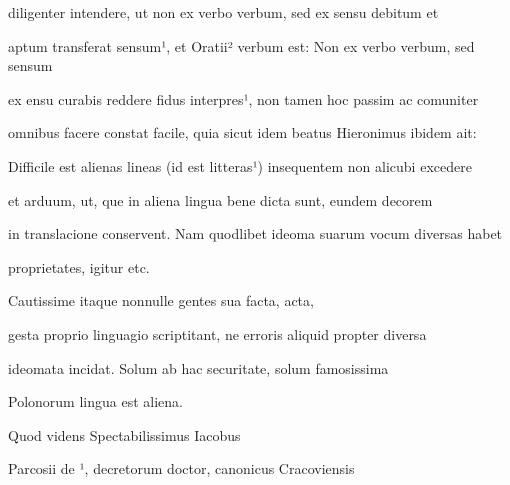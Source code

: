 \fulllines{}

diligenter intendere, ut non ex verbo verbum, sed ex sensu debitum et



aptum transferat sensum¹, et Oratii² verbum est: Non ex verbo verbum, sed sensum
%

ex ensu curabis reddere fidus interpres¹, non tamen hoc passim ac comuniter

omnibus facere constat facile, quia sicut idem beatus Hieronimus ibidem ait:

Difficile est alienas lineas (id est litteras¹) insequentem non alicubi excedere

et arduum, ut, que in aliena lingua bene dicta sunt, eundem decorem

in translacione conservent. Nam quodlibet ideoma suarum vocum diversas habet

\splitlines{}

proprietates, igitur etc.

\indentK Cautissime itaque nonnulle gentes sua facta, acta,

\fulllines{}

gesta proprio linguagio scriptitant, ne erroris aliquid propter diversa

ideomata incidat. Solum ab hac securitate, solum famosissima

\splitlines{}

Polonorum lingua est aliena.

\indentK Quod videns Spectabilissimus Iacobus

\fulllines{}


\newpage
{}

Parcosii de ¹, decretorum doctor, canonicus Cracoviensis

